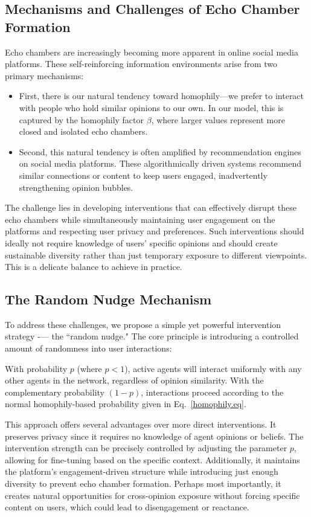 \subsection{Mechanisms and Challenges of Echo Chamber Formation}
Echo chambers are increasingly becoming more apparent in online social media platforms. These self-reinforcing information environments arise from two primary mechanisms:
\begin{itemize}
    \item First, there is our natural tendency toward homophily—we prefer to interact with people who hold similar opinions to our own. In our model, this is captured by the homophily factor $\beta$, where larger values represent more closed and isolated echo chambers. 
    \item Second, this natural tendency is often amplified by recommendation engines on social media platforms. These algorithmically driven systems recommend similar connections or content to keep users engaged, inadvertently strengthening opinion bubbles.
\end{itemize}
The challenge lies in developing interventions that can effectively disrupt these echo chambers while simultaneously maintaining user engagement on the platforms and respecting user privacy and preferences. Such interventions should ideally not require knowledge of users' specific opinions and should create sustainable diversity rather than just temporary exposure to different viewpoints. This is a delicate balance to achieve in practice.
\subsection{The Random Nudge Mechanism}
To address these challenges, we propose a simple yet powerful intervention strategy -— the ``random nudge." The core principle is introducing a controlled amount of randomness into user interactions:

With probability $p$ (where $p < 1$), active agents will interact uniformly with any other agents in the network, regardless of opinion similarity. With the complementary probability $(1 - p)$, interactions proceed according to the normal homophily-based probability given in Eq.~\eqref{homophily.eq}.

This approach offers several advantages over more direct interventions. It preserves privacy since it requires no knowledge of agent opinions or beliefs. The intervention strength can be precisely controlled by adjusting the parameter $p$, allowing for fine-tuning based on the specific context. Additionally, it maintains the platform's engagement-driven structure while introducing just enough diversity to prevent echo chamber formation. Perhaps most importantly, it creates natural opportunities for cross-opinion exposure without forcing specific content on users, which could lead to disengagement or reactance.
